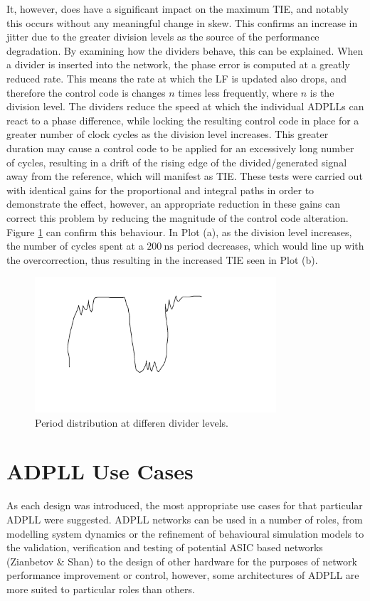 It, however, does have a significant impact on the maximum \ac{TIE}, and notably this occurs without any meaningful change in skew. This confirms an increase in jitter due to the greater division levels as the source of the performance degradation. By examining how the dividers behave, this can be explained. When a divider is inserted into the network, the phase error is computed at a greatly reduced rate. This means the rate at which the \ac{LF} is updated also drops, and therefore the control code is changes $n$ times less frequently, where $n$ is the division level. The dividers reduce the speed at which the individual \ac{ADPLL}s can react to a phase difference, while locking the resulting control code in place for a greater number of clock cycles as the division level increases. This greater duration may cause a control code to be applied for an excessively long number of cycles, resulting in a drift of the rising edge of the divided/generated signal away from the reference, which will manifest as \ac{TIE}. These tests were carried out with identical gains for the proportional and integral paths in order to demonstrate the effect, however, an appropriate reduction in these gains can correct this problem by reducing the magnitude of the control code alteration.
Figure \ref{fig:todo_div} can confirm this behaviour. In Plot (a), as the division level increases, the number of cycles spent at a $200~\si{\nano\second}$ period decreases, which would line up with the overcorrection, thus resulting in the increased \ac{TIE} seen in Plot (b).
\begin{figure}[h]%
    \centering
    \includegraphics[width=0.8\textwidth]{../bad_waveform}
    \caption[Period distribution at differen divider levels]{Period distribution at differen divider levels.}    
    \label{fig:todo_div}
\end{figure}

\section*{\acs{ADPLL} Use Cases}
As each design was introduced, the most appropriate use cases for that particular \ac{ADPLL} were suggested. \ac{ADPLL} networks can be used in a number of roles, from modelling system dynamics or the refinement of behavioural simulation models to the validation, verification and testing of potential \ac{ASIC} based networks (Zianbetov \& Shan) to the design of other hardware for the purposes of network performance improvement or control, however, some architectures of \ac{ADPLL} are more suited to particular roles than others.


